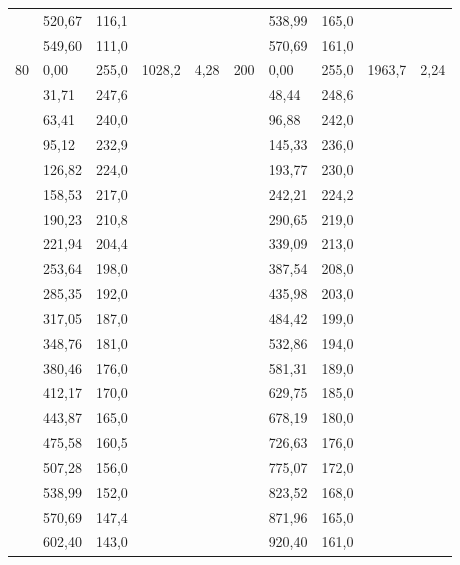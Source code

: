 \documentclass[a4paper,12pt]{article}
\theoremstyle{plain} %
\theoremstyle{definition} %
\theoremstyle{remark} %
\begin{document}
\begin{center}
\begin{tabular}{ | l | l | l | l | l | l | l | l | l | l |}
              	    &	520,67	&	116,1	&	  	&	&	&   538,99	&	165,0	&	  	&  	\\
              	    &	549,60	&	111,0	&	  	&	&	&   570,69	&	161,0	&	  	&  	\\
                \hline
                80	&	0,00	&	255,0	&	1028,2	&	4,28    &   200	&	0,00	&	255,0	&	1963,7	&	2,24	\\
              	    &	31,71	&	247,6	&	  	&   &	&   48,44	&	248,6	&	  	&   \\
              	    &	63,41	&	240,0	&	  	&   &   &	96,88	&	242,0	&	  	&	\\
              	    &	95,12	&	232,9	&	  	&   &   &	145,33	&	236,0	&	  	&	\\
              	    &	126,82	&	224,0	&	  	&   &   &	193,77	&	230,0	&	  	&	\\
              	    &	158,53	&	217,0	&	  	&   &   &	242,21	&	224,2	&	  	&	\\
              	    &   190,23	&	210,8	&	  	&   &   &	290,65	&	219,0	&	  	&	\\
              	    &	221,94	&	204,4	&	  	&   &	&   339,09	&	213,0	&	  	&	\\
              	    &	253,64	&	198,0	&	  	&   &   &	387,54	&	208,0	&	  	&	\\
              	    &	285,35	&	192,0	&	  	&   &	&   435,98	&	203,0	&	  	&	\\
              	    &	317,05	&	187,0	&	  	&   &   &	484,42	&	199,0	&	  	&	\\
              	    &	348,76	&	181,0	&	  	&   &   &	532,86	&	194,0	&	  	&	\\
              	    &	380,46	&	176,0	&	  	&   &   &	581,31	&	189,0	&	  	&	\\
              	    &	412,17	&	170,0	&	  	&   &   &	629,75	&	185,0	&	  	&	\\
              	    &	443,87	&	165,0	&	  	&   &   &	678,19	&	180,0	&	  	&	\\
              	    &	475,58	&	160,5	&	  	&   &   &	726,63	&	176,0	&	  	&	\\
              	    &	507,28	&	156,0	&	  	&   &   &	775,07	&	172,0	&	  	&	\\
              	    &	538,99	&	152,0	&	  	&   &   &	823,52	&	168,0	&	  	&	\\
              	    &	570,69	&	147,4	&	  	&   &   &	871,96	&	165,0	&	  	&	\\
              	    &	602,40	&	143,0	&	  	&   &   &	920,40	&	161,0	&	  	&	\\
                \hline
            \end{tabular}
        \end{center}
\end{document}
